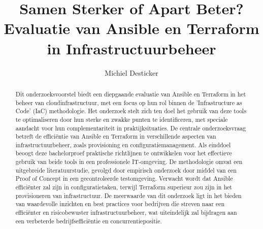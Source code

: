 \documentclass{hogent-article}
\title{Samen Sterker of Apart Beter? Evaluatie van Ansible en Terraform in Infrastructuurbeheer}
\author{Michiel Desticker}
\begin{document}
\begin{abstract}
  
  Dit onderzoeksvoorstel biedt een diepgaande evaluatie van Ansible en Terraform in het beheer van cloudinfrastructuur, met een focus op hun rol binnen de 'Infrastructure as Code' (IaC) methodologie. Het onderzoek stelt zich ten doel het gebruik van deze tools te optimaliseren door hun sterke en zwakke punten te identificeren, met speciale aandacht voor hun complementariteit in praktijksituaties. De centrale onderzoeksvraag betreft de efficiëntie van Ansible en Terraform in verschillende aspecten van infrastructuurbeheer, zoals provisioning en configuratiemanagement. Als einddoel beoogt deze bachelorproef praktische richtlijnen te ontwikkelen voor het effectieve gebruik van beide tools in een professionele IT-omgeving. De methodologie omvat een uitgebreide literatuurstudie, gevolgd door empirisch onderzoek door middel van een Proof of Concept in een gecontroleerde testomgeving. Verwacht wordt dat Ansible efficiënter zal zijn in configuratietaken, terwijl Terraform superieur zou zijn in het provisioneren van infrastructuur. De meerwaarde van dit onderzoek ligt in het bieden van waardevolle inzichten en best practices voor bedrijven die streven naar een efficiënter en risicobewuster infrastructuurbeheer, wat uiteindelijk zal bijdragen aan een verbeterde bedrijfsefficiëntie en concurrentiepositie.

\end{abstract}

\tableofcontents



\printbibliography[heading=bibintoc]
\end{document}
